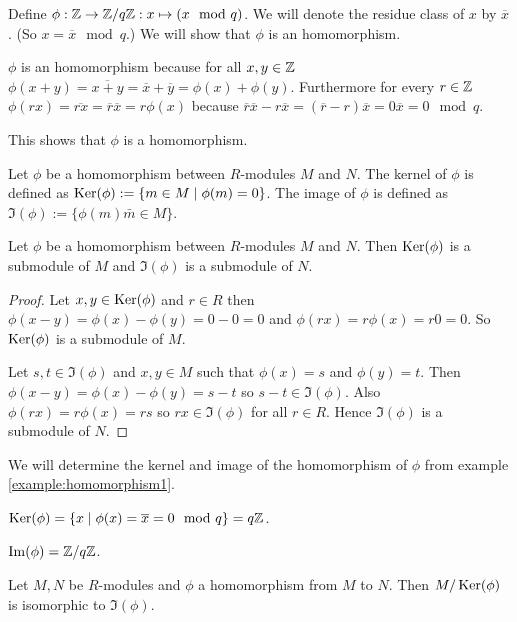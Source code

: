 \begin{example}\label{example:homomorphism1}
	Define $\phi : \mathbb{Z} \rightarrow \mathbb{Z}/q\mathbb{Z} : x \mapsto (x \mod q)$. We will
	denote the residue class of $x$ by $\overline{x}$. (So $x = \overline{x}
	\mod q$.) We will show that $\phi$ is an homomorphism.
	
	$\phi$ is an homomorphism because for all $x,y\in\mathbb{Z}$ $\phi(x+y) =
	\overline{x+y} = \overline{x} + \overline{y} = \phi(x) + \phi(y)$.
	Furthermore for every $r\in\mathbb{Z}$ $\phi(rx) = \overline{rx} =
	\overline{r}\overline{x} = r\phi(x)$ because $\overline{r}\overline{x} -
	r\overline{x} = (\overline{r}-r)\overline{x} = 0\overline{x} = 0 \mod
	q$.
	
	This shows that $\phi$ is a homomorphism.
\end{example}

\begin{definition}
	Let $\phi$ be a homomorphism between $R$-modules $M$ and $N$. The kernel
	of $\phi$ is defined as $\operatorname{Ker}(\phi) := \{m\in M \thickspace|\thickspace \phi(m)= 0\}$. The
	image of $\phi$ is defined as $\Im(\phi) := \{\phi(m) \bar m\in M\}$.
\end{definition}

\begin{lemma}
	Let $\phi$ be a homomorphism between $R$-modules $M$ and $N$. Then
	$\operatorname{Ker}(\phi)$ is a submodule of $M$ and $\Im(\phi)$ is a submodule of
	$N$.
\end{lemma}

\begin{proof}
	Let $x,y\in\operatorname{Ker}(\phi)$ and $r\in R$ then $\phi(x-y) = \phi(x) - \phi(y)
	= 0 - 0 = 0$ and $\phi(rx) = r\phi(x) = r0 = 0$. So $\operatorname{Ker}(\phi)$ is a
	submodule of $M$.
	
	Let $s,t\in\Im(\phi)$ and $x,y\in M$ such that $\phi(x)=s$ and
	$\phi(y)=t$. Then $\phi(x-y) = \phi(x) - \phi(y) = s-t$ so
	$s-t\in\Im(\phi)$. Also $\phi(rx) = r\phi(x) = rs$ so $rx\in\Im(\phi)$
	for all $r\in R$. Hence $\Im(\phi)$ is a submodule of $N$.
\end{proof}

\begin{example}\label{example:homomorphism2}
	We will determine the kernel and image of the homomorphism of $\phi$
	from example \ref{example:homomorphism1}.
	
	$\operatorname{Ker}(\phi) = \{x \thickspace|\thickspace \phi(x) = \overline{x} = 0 \mod q\} = q\mathbb{Z}$.
	
	$\operatorname{Im}(\phi) = \mathbb{Z}/q\mathbb{Z}$.
\end{example}

\begin{proposition}
	Let $M,N$ be $R$-modules and $\phi$ a homomorphism from $M$ to $N$. Then
	$M/\operatorname{Ker}(\phi)$ is isomorphic to	$\Im(\phi)$.
\end{proposition}

